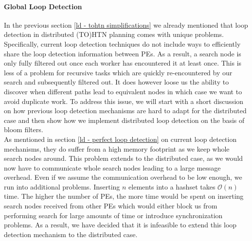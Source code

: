\paragraph{Global Loop Detection}
\label{ld - global}
In the previous section \ref{ld - tohtn simplifications} we already mentioned that loop detection in distributed (TO)HTN planning comes with unique problems. Specifically, current loop detection techniques do not include ways to efficiently share the loop detection information between PEs. As a result, a search node is only fully filtered out once each worker has encountered it at least once. This is less of a problem for recursive tasks which are quickly re-encountered by our search and subsequently filtered out. It does however loose us the ability to discover when different paths lead to equivalent nodes in which case we want to avoid duplicate work. To address this issue, we will start with a short discussion on how previous loop detection mechanisms are hard to adapt for the distributed case and then show how we implement distributed loop detection on the basis of bloom filters. \\
As mentioned in section \ref{ld - perfect loop detection} on current loop detection mechanisms, they do suffer from a high memory footprint as we keep whole search nodes around. This problem extends to the distributed case, as we would now have to communicate whole search nodes leading to a large message overhead. Even if we assume the communication overhead to be low enough, we run into additional problems. Inserting $n$ elements into a hashset takes $\mathcal{O}(n)$ time. The higher the number of PEs, the more time would be spent on inserting search nodes received from other PEs which would either block us from performing search for large amounts of time or introduce synchronization problems. As a result, we have decided that it is infeasible to extend this loop detection mechanism to the distributed case. \\
\begin{comment}
- insertion of $n$ search nodes is expensive
- encoding and decoding becomes more difficult, especially


- previous section \ref{ld - tohtn simplifications} mentions that distributed planning makes loop detection less efficient
- recursion is still fine
- different paths leading to equivalent nodes are no longer detected

- normal loop detection gets worse in distributed (TO)HTN planning
- each worker tracks it's own set of known nodes
- if worker $w_1$ encounters a node, workers $w_2, \ldots, w_n$ will not filter that node out until they've encountered it themselves at least once

- we try to find a way to perform global loop detection
\end{comment}
